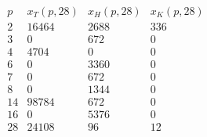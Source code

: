 \[\begin{array}{c|rrr}
p&x_T(p,28)&x_H(p,28)&x_K(p,28)\\\hline
2&16464&2688&336\\
3&0&672&0\\
4&4704&0&0\\
6&0&3360&0\\
7&0&672&0\\
8&0&1344&0\\
14&98784&672&0\\
16&0&5376&0\\
28&24108&96&12\\
\end{array}\]
